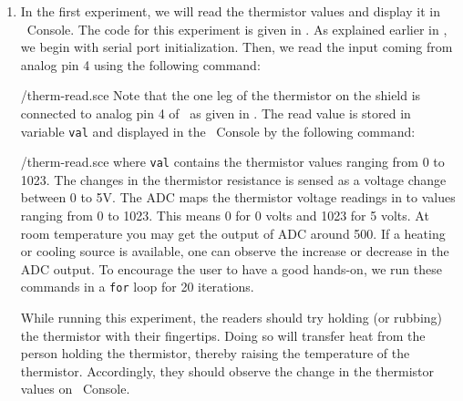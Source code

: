 
\begin{enumerate}
  \item In the first experiment, we will read the thermistor values and display it in
        \scilab\ Console. The code for this experiment is
        given in . As explained earlier in ,
        we begin with serial port initialization. Then, we read the input coming from
        analog pin 4 using the following command:
        
        {\LocTHERMscicode/therm-read.sce}
        Note that the one leg of the thermistor on
        the shield is connected to analog pin 4 of \arduino\,
        as given in . The read value is stored in variable {\tt val} and
        displayed in the \scilab\ Console by the following command:
        
        {\LocTHERMscicode/therm-read.sce} where {\tt val} contains
        the thermistor values ranging from 0 to 1023. The changes in
        the thermistor resistance is sensed as a voltage change between 0 to
        5V. The ADC maps the thermistor voltage readings in to values
        ranging from 0 to 1023. This means 0 for 0 volts and 1023 for 5
        volts. At room temperature you may get the
        output of ADC around 500. If a heating or cooling source is available,
        one can observe the increase or decrease in the ADC output. To
        encourage the user to have a good hands-on, we run these commands in
        a {\tt for} loop for 20 iterations.

        While running this experiment,
        the readers should try holding (or rubbing) the thermistor with their fingertips.
        Doing so will transfer heat from the person holding the
        thermistor, thereby raising the temperature of the thermistor. Accordingly, they should observe the change in the thermistor
        values on \scilab\ Console.




\end{enumerate}

